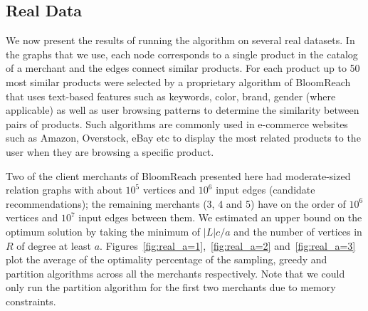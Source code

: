 \subsection{Real Data}

We now present the results of running the algorithm on several real
datasets. In the graphs that we use, each node corresponds to a single
product in the catalog of a merchant and the edges connect similar
products. For each product up to 50 most similar products were
selected by a proprietary algorithm of BloomReach that uses text-based
features such as keywords, color, brand, gender (where applicable) as
well as user browsing patterns to determine the similarity between
pairs of products. Such algorithms are commonly used in e-commerce websites
such as Amazon, Overstock, eBay etc to display the most related products 
to the user when they are browsing a specific product. 

Two of the client merchants of BloomReach presented here had
moderate-sized relation graphs with about $10^5$ vertices and $10^6$
input edges (candidate recommendations); the remaining merchants (3, 4
and 5) have on the order of $10^6$ vertices and $10^7$ input edges
between them.  We estimated an upper bound on the optimum solution by
taking the minimum of $|L|c/a$ and the number of vertices in $R$ of
degree at least $a$. Figures~\ref{fig:real_a=1},~\ref{fig:real_a=2}
and~\ref{fig:real_a=3} plot the average of the optimality percentage
of the sampling, greedy and partition algorithms across all the
merchants respectively. Note that we could only run the partition
algorithm for the first two merchants due to memory constraints. \vs

